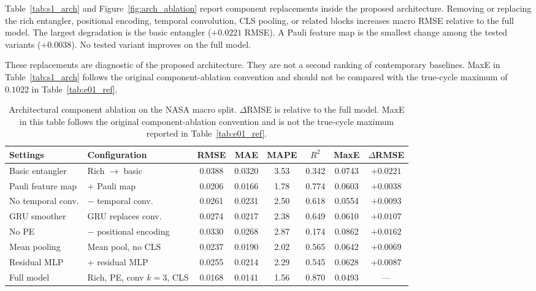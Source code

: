 Table~\ref{tab:s1_arch} and Figure~\ref{fig:arch_ablation} report component replacements inside the proposed architecture. Removing or replacing the rich entangler, positional encoding, temporal convolution, CLS pooling, or related blocks increases macro RMSE relative to the full model. The largest degradation is the basic entangler ($+0.0221$ RMSE). A Pauli feature map is the smallest change among the tested variants ($+0.0038$). No tested variant improves on the full model.

These replacements are diagnostic of the proposed architecture. They are not a second ranking of contemporary baselines. MaxE in Table~\ref{tab:s1_arch} follows the original component-ablation convention and should not be compared with the true-cycle maximum of $0.1022$ in Table~\ref{tab:e01_ref}.

\begin{table}[htbp]
\centering
\footnotesize
\caption{Architectural component ablation on the NASA macro split. $\Delta$RMSE is relative to the full model. MaxE in this table follows the original component-ablation convention and is not the true-cycle maximum reported in Table~\ref{tab:e01_ref}.}\label{tab:s1_arch}\label{tab:nasa_ablation}
\begin{tabular*}{\textwidth}{@{}LLCCCCCC@{}}
\toprule
Settings & Configuration & RMSE & MAE & MAPE & $R^2$ & MaxE & $\Delta$RMSE \\
\midrule
Basic entangler & Rich $\rightarrow$ basic & 0.0388 & 0.0320 & 3.53 & 0.342 & 0.0743 & $+0.0221$ \\
Pauli feature map & $+$ Pauli map & 0.0206 & 0.0166 & 1.78 & 0.774 & 0.0603 & $+0.0038$ \\
No temporal conv. & $-$ temporal conv. & 0.0261 & 0.0231 & 2.50 & 0.618 & 0.0554 & $+0.0093$ \\
GRU smoother & GRU replaces conv. & 0.0274 & 0.0217 & 2.38 & 0.649 & 0.0610 & $+0.0107$ \\
No PE & $-$ positional encoding & 0.0330 & 0.0268 & 2.87 & 0.174 & 0.0862 & $+0.0162$ \\
Mean pooling & Mean pool, no CLS & 0.0237 & 0.0190 & 2.02 & 0.565 & 0.0642 & $+0.0069$ \\
Residual MLP & $+$ residual MLP & 0.0255 & 0.0214 & 2.29 & 0.545 & 0.0628 & $+0.0087$ \\
Full model & Rich, PE, conv $k{=}3$, CLS & 0.0168 & 0.0141 & 1.56 & 0.870 & 0.0493 & --- \\
\bottomrule
\end{tabular*}
\end{table}

